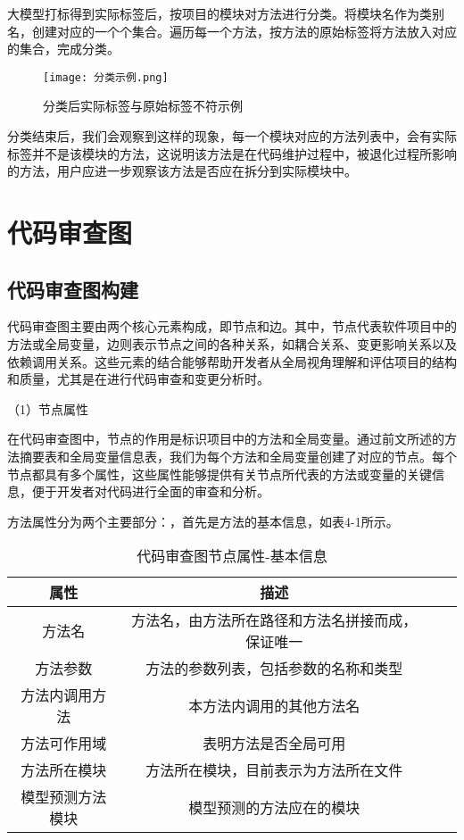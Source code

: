 大模型打标得到实际标签后，按项目的模块对方法进行分类。将模块名作为类别名，创建对应的一个个集合。遍历每一个方法，按方法的原始标签将方法放入对应的集合，完成分类。

\begin{figure}[h]
\centering
\texttt{[image: 分类示例.png]}
\caption{分类后实际标签与原始标签不符示例}
\end{figure}

分类结束后，我们会观察到这样的现象，每一个模块对应的方法列表中，会有实际标签并不是该模块的方法，这说明该方法是在代码维护过程中，被退化过程所影响的方法，用户应进一步观察该方法是否应在拆分到实际模块中。


\section{代码审查图}

\subsection{代码审查图构建}

代码审查图主要由两个核心元素构成，即节点和边。其中，节点代表软件项目中的方法或全局变量，边则表示节点之间的各种关系，如耦合关系、变更影响关系以及依赖调用关系。这些元素的结合能够帮助开发者从全局视角理解和评估项目的结构和质量，尤其是在进行代码审查和变更分析时。

（1）节点属性

在代码审查图中，节点的作用是标识项目中的方法和全局变量。通过前文所述的方法摘要表和全局变量信息表，我们为每个方法和全局变量创建了对应的节点。每个节点都具有多个属性，这些属性能够提供有关节点所代表的方法或变量的关键信息，便于开发者对代码进行全面的审查和分析。

方法属性分为两个主要部分：，首先是方法的基本信息，如表4-1所示。

\begin{table}[htbp]
\caption{代码审查图节点属性-基本信息}
\vspace{0.5em}\centering\wuhao
\begin{tabular}{cccc}
\toprule
    属性 & 描述 \\
\midrule
方法名 & 方法名，由方法所在路径和方法名拼接而成，保证唯一  \\
方法参数 & 方法的参数列表，包括参数的名称和类型   \\
方法内调用方法 & 本方法内调用的其他方法名   \\
方法可作用域 & 表明方法是否全局可用   \\
方法所在模块 &  方法所在模块，目前表示为方法所在文件  \\
模型预测方法模块 & 模型预测的方法应在的模块   \\     
\bottomrule
\end{tabular}
\end{table}


